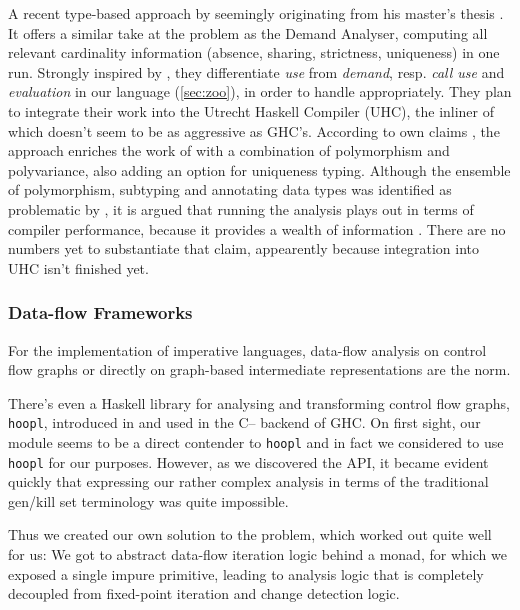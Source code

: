 A recent type-based approach by \textcite{verstoep} seemingly originating from his master's thesis \parencite{verstoepthesis}. 
It offers a similar take at the problem as the Demand Analyser, computing all relevant cardinality information (absence, sharing, strictness, uniqueness) in one run.
Strongly inspired by \textcite{warnsbrough}, they differentiate \emph{use} from \emph{demand}, resp. \emph{call use} and \emph{evaluation} in our language (\cf \cref{sec:zoo}), in order to handle  appropriately.
They plan to integrate their work into the Utrecht Haskell Compiler (UHC), the inliner of which doesn't seem to be as aggressive as GHC's.
According to own claims \parencite{verstoepthesis}, the approach enriches the work of \textcite{warnsbrough} with a combination of polymorphism and polyvariance, also adding an option for uniqueness typing.
Although the ensemble of polymorphism, subtyping and annotating data types was identified as problematic by \textcite{card}, it is argued that running the analysis plays out in terms of compiler performance, because it provides a wealth of information \parencite{verstoep}.
There are no numbers yet to substantiate that claim, appearently because integration into UHC isn't finished yet.

\subsubsection{Data-flow Frameworks}

For the implementation of imperative languages, data-flow analysis on control flow graphs or directly on graph-based intermediate representations \parencite{firm} \parencite{thorin} are the norm.

There's even a Haskell library for analysing and transforming control flow graphs, \texttt{hoopl}, introduced in \textcite{hoopl} and used in the C-- backend of GHC.
On first sight, our  module seems to be a direct contender to \texttt{hoopl} and in fact we considered to use \texttt{hoopl} for our purposes.
However, as we discovered the API, it became evident quickly that expressing our rather complex analysis in terms of the traditional gen/kill set terminology was quite impossible. 

Thus we created our own solution to the problem, which worked out quite well for us:
We got to abstract data-flow iteration logic behind a  monad, for which we exposed a single impure primitive, leading to analysis logic that is completely decoupled from fixed-point iteration and change detection logic.

